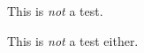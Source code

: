 \documentclass[a4paper]{article}
\begin{document}
This is \emph{not} a {\XeTeX} test.

This is \emph{not} a {\XeLaTeX} test either.
\end{document}
